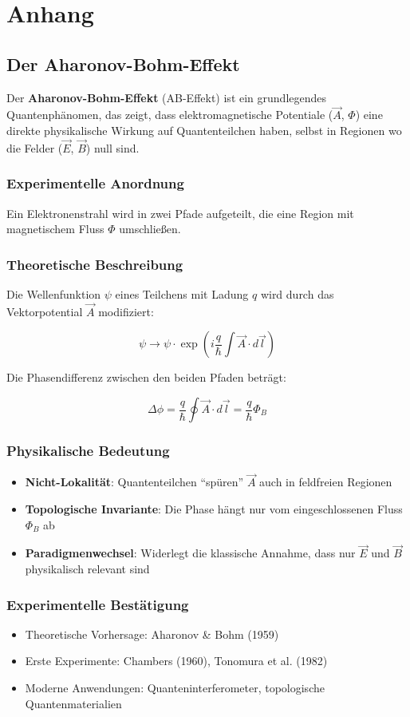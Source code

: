 \chapter{Anhang}
\section{Der Aharonov-Bohm-Effekt}
\label{sec:aharonov-bohm}

Der \textbf{Aharonov-Bohm-Effekt} (AB-Effekt) ist ein grundlegendes Quantenphänomen, das zeigt, dass elektromagnetische Potentiale ($\vec{A}$, $\Phi$) eine direkte physikalische
Wirkung auf Quantenteilchen haben, selbst in Regionen wo die Felder ($\vec{E}$, $\vec{B}$) null sind.

\subsection{Experimentelle Anordnung}
Ein Elektronenstrahl wird in zwei Pfade aufgeteilt, die eine Region mit magnetischem Fluss $\Phi$ umschließen.

\subsection{Theoretische Beschreibung}
Die Wellenfunktion $\psi$ eines Teilchens mit Ladung $q$ wird durch das Vektorpotential $\vec{A}$ modifiziert:

\begin{equation}
\psi \rightarrow \psi \cdot \exp\left(i\frac{q}{\hbar}\int \vec{A}\cdot d\vec{l}\right)
\end{equation}

Die Phasendifferenz zwischen den beiden Pfaden beträgt:

\begin{equation}
\Delta\phi = \frac{q}{\hbar}\oint \vec{A}\cdot d\vec{l} = \frac{q}{\hbar}\Phi_B
\end{equation}

\subsection{Physikalische Bedeutung}
\begin{itemize}
\item \textbf{Nicht-Lokalität}: Quantenteilchen \enquote{spüren} $\vec{A}$ auch in feldfreien Regionen
\item \textbf{Topologische Invariante}: Die Phase hängt nur vom eingeschlossenen Fluss $\Phi_B$ ab
\item \textbf{Paradigmenwechsel}: Widerlegt die klassische Annahme, dass nur $\vec{E}$ und $\vec{B}$ physikalisch relevant sind
\end{itemize}

\subsection{Experimentelle Bestätigung}
\begin{itemize}
\item Theoretische Vorhersage: Aharonov \& Bohm (1959)
\item Erste Experimente: Chambers (1960), Tonomura et al. (1982)
\item Moderne Anwendungen: Quanteninterferometer, topologische Quantenmaterialien
\end{itemize}
